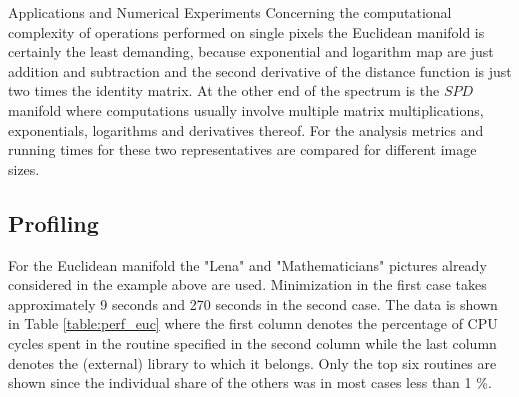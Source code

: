\begin{chapter}{Applications and Numerical Experiments}
Concerning the computational complexity of operations performed on single pixels the Euclidean manifold is certainly the least demanding, because exponential and logarithm map are just 
addition and subtraction and the second derivative of the distance function is just two times the identity matrix. At the other end of the spectrum is the $SPD$ manifold where
computations usually involve multiple matrix multiplications, exponentials, logarithms and derivatives thereof. For the analysis metrics 
and running times for these two representatives are compared for different image sizes.\\

\subsection{Profiling}
For the Euclidean manifold the "Lena" and "Mathematicians" pictures already considered in the example above are used. Minimization in the first case takes approximately 9 seconds and 270 seconds in
the second case. The data is shown in Table \ref{table:perf_euc} where the first column denotes the percentage of CPU cycles spent in the routine specified in the second column 
while the last column denotes the (external) library to which it belongs. Only the top six routines are shown since the individual share of the others was in most cases less than 1 \%. \\


\end{chapter}
